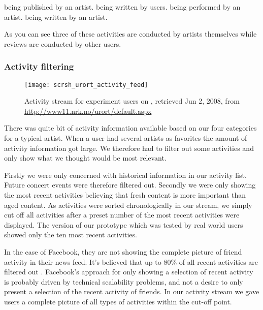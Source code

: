 \begin{items}
   being published by an artist.
   being written by users.
   being performed by an artist.
   being written by an artist.
\end{items}

As you can see three of these activities are conducted by artists themselves
while reviews are conducted by other users.

\subsubsection{Activity filtering}

\begin{figure}
  \texttt{[image: scrsh\_urort\_activity\_feed]}
  \caption[\urort{} Activity Stream]{
    Activity stream for experiment users on \urort{},
    retrieved Jun 2, 2008, from
    \url{http://www11.nrk.no/urort/default.aspx}
  }
  \label{figure:scrsh.urort.activity.feed}
\end{figure}

There was quite bit of activity information available based on our four
categories for a typical artist. When a user had several artists as
favorites the amount of activity information got large. We therefore had
to filter out some activities and only show what we thought would be most
relevant.

Firstly we were only concerned with historical information in our activity
list. Future concert events were therefore filtered out. Secondly we were only
showing
the most recent activities believing that fresh content is more important than
aged content. As activities were sorted chronologically in our stream, we
simply cut off all activities after a preset number of the most recent
activities were displayed. The version of our prototype which was tested by
real world users showed only the ten most recent activities.

In the case of Facebook,
they are not showing the complete picture of friend activity in their news
feed. It's believed that up to 80\% of all recent activities are filtered
out \citep{elliott08}.
Facebook's approach for only showing a selection of recent activity is
probably driven by technical scalability problems, and not a desire to only
present a selection of the recent activity of friends. In our activity stream
we gave users a complete picture of all types of activities within the
cut-off point.

